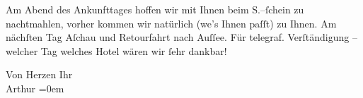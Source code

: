 \pstart
           Am Abend des Ankunfttages hoffen wir mit Ihnen beim S.–ſchein zu nachtmahlen, vorher kommen wir natürlich (we{\geminationn}’s Ihnen paſſt) zu Ihnen. Am nächſten Tag Aſchau und Retourfahrt nach Auſſee. Für telegraf. Verſtändigung – welcher Tag welches Hotel
               wären wir{ }ſehr dankbar!\pend
           
\pstart
           Von Herzen Ihr{\\[\baselineskip]}\spacefill\mbox{Arthur}\pend
           \leftskip=0em{}\endnumbering{}  \newcommand{\dateiname}{L02237}\newcommand{\titel}{Arthur Schnitzler an Richard Beer-Hofmann, 20. 8. 1916}\newcommand{\editorInnen}{Martin Anton Müller und Gerd-Hermann Susen}
